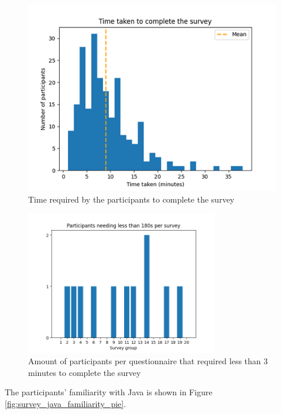 \documentclass[%
class=scrreprt,
chapterprefix=false,%
open=right,%
twoside=false,%
paper=a4,%
logofile={Logo\_zentral\_farbig\_EN.png},%
thesistype=master,%
UKenglish,%
]{se2thesis}
\theoremstyle{definition}
\begin{document}
	\begin{figure}[t]
		\centering
		\includegraphics[width=\textwidth]{img/survey_time_histogramm.png}
		\caption{Time required by the participants to complete the survey}
		\label{fig:survey_time_histogramm}
	\end{figure}
	
	\begin{figure}[t]
		\centering
		\includegraphics[width=0.75\textwidth]{img/survey_time_less_than_180.png}
		\caption{Amount of participants per questionnaire that required less than 3 minutes to complete the survey}
		\label{fig:survey_time_less_than_180}
	\end{figure}
	
	The participants' familiarity with Java is shown in Figure \ref{fig:survey_java_familiarity_pie}.
	
\end{document}
